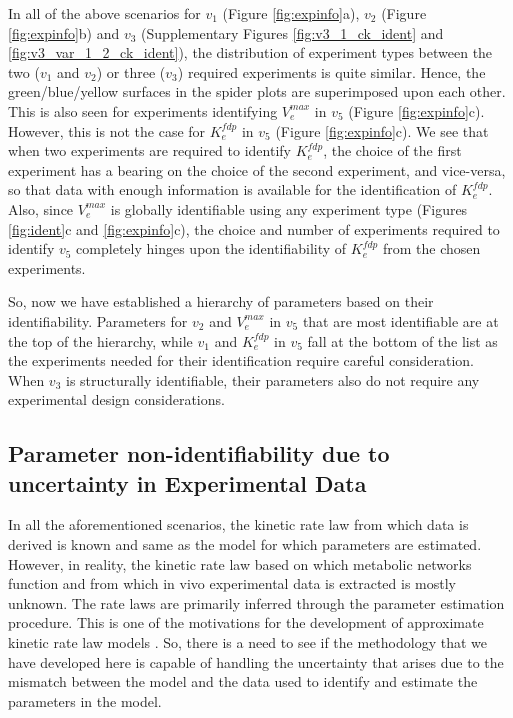 \documentclass[10pt]{article}
\begin{document}
	In all of the above scenarios for $v_1$ (Figure \ref{fig:expinfo}a), $v_2$ (Figure \ref{fig:expinfo}b) and $v_3$ (Supplementary Figures \ref{fig:v3_1_ck_ident} and \ref{fig:v3_var_1_2_ck_ident}), the distribution of experiment types between the two ($v_1$ and $v_2$) or three ($v_3$) required experiments is quite similar. Hence, the green/blue/yellow surfaces in the spider plots are superimposed upon each other. This is also seen for experiments identifying $V_e^{max}$ in $v_5$ (Figure \ref{fig:expinfo}c). However, this is not the case for $K_e^{fdp}$ in $v_5$ (Figure \ref{fig:expinfo}c). We see that when two experiments are required to identify $K_e^{fdp}$, the choice of the first experiment has a bearing on the choice of the second experiment, and vice-versa, so that data with enough information is available for the identification of $K_e^{fdp}$. Also, since $V_e^{max}$ is globally identifiable using any experiment type (Figures \ref{fig:ident}c and \ref{fig:expinfo}c), the choice and number of experiments required to identify $v_5$ completely hinges upon the identifiability of $K_e^{fdp}$ from the chosen experiments.	
	
	So, now we have established a hierarchy of parameters based on their identifiability. Parameters for $v_2$ and $V_e^{max}$ in $v_5$ that are most identifiable are at the top of the hierarchy, while $v_1$ and $K_e^{fdp}$ in $v_5$ fall at the bottom of the list as the experiments needed for their identification require careful consideration. When $v_3$ is structurally identifiable, their parameters also do not require any experimental design considerations.
	
	\subsection{Parameter non-identifiability due to uncertainty in Experimental Data}\label{sec:uncertainty}
	In all the aforementioned scenarios, the kinetic rate law from which data is derived is known and same as the model for which parameters are estimated. However, in reality, the kinetic rate law based on which metabolic networks function and from which in vivo experimental data is extracted is mostly unknown. The rate laws are primarily inferred through the parameter estimation procedure. This is one of the motivations for the development of approximate kinetic rate law models \parencite{Heijnen2013,Smallbone2007,Berthoumieux2013}.
	So, there is a need to see if the methodology that we have developed here is capable of handling the uncertainty that arises due to the mismatch between the model and the data used to identify and estimate the parameters in the model.
	
\end{document}
